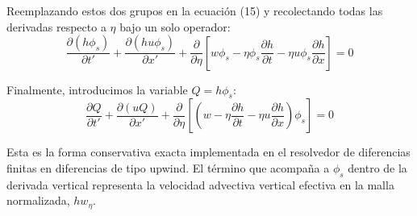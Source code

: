 \documentclass[11pt,a4paper]{article}
\begin{document}
Reemplazando estos dos grupos en la ecuación (15) y recolectando todas las derivadas respecto a $\eta$ bajo un solo operador:
\begin{equation}
    \frac{\partial (h\phi_s)}{\partial t'} + \frac{\partial (hu\phi_s)}{\partial x'} + \frac{\partial}{\partial \eta} \left[ w\phi_s - \eta \phi_s \frac{\partial h}{\partial t} - \eta u \phi_s \frac{\partial h}{\partial x} \right] = 0
\end{equation}

Finalmente, introducimos la variable $Q = h\phi_s$:
\begin{equation}
    \frac{\partial Q}{\partial t'} + \frac{\partial (u Q)}{\partial x'} + \frac{\partial}{\partial \eta} \left[ \left( w - \eta \frac{\partial h}{\partial t} - \eta u \frac{\partial h}{\partial x} \right) \phi_s \right] = 0
\end{equation}

Esta es la forma conservativa exacta implementada en el resolvedor de diferencias finitas en diferencias de tipo upwind. El término que acompaña a $\phi_s$ dentro de la derivada vertical representa la velocidad advectiva vertical efectiva en la malla normalizada, $h w_\eta$.
\end{document}
